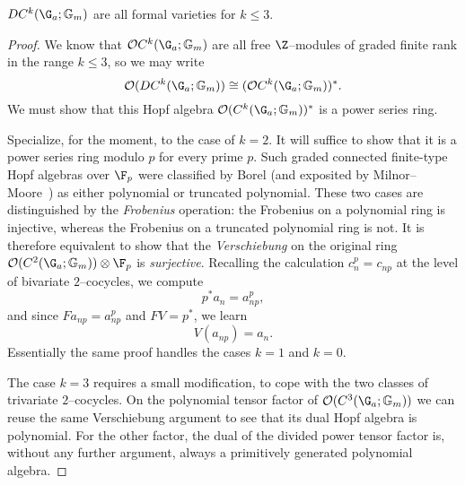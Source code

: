 \begin{lemma}\label{CkGaGmAreFVars}
\(DC^k(\G_a; \Gm)\) are all formal varieties for \(k \le 3\).
\end{lemma}
\begin{proof}
We know that \(\sheaf O C^k(\G_a; \Gm)\) are all free \(\Z\)--modules of graded finite rank in the range \(k \le 3\), so we may write \[\sheaf O(D C^k(\G_a; \Gm)) \cong (\sheaf O C^k(\G_a; \Gm))^*.\]  We must show that this Hopf algebra \(\sheaf O(C^k(\G_a; \Gm))^*\) is a power series ring.

Specialize, for the moment, to the case of \(k = 2\).  It will suffice to show that it is a power series ring modulo \(p\) for every prime \(p\).  Such graded connected finite-type Hopf algebras over \(\F_p\) were classified by Borel (and exposited by Milnor--Moore~\cite[Theorem 7.11]{MilnorMoore}) as either polynomial or truncated polynomial.  These two cases are distinguished by the \textit{Frobenius} operation: the Frobenius on a polynomial ring is injective, whereas the Frobenius on a truncated polynomial ring is not.  It is therefore equivalent to show that the \emph{Verschiebung} on the original ring \(\sheaf O(C^2(\G_a; \Gm)) \otimes \F_p\) is \emph{surjective}.  Recalling the calculation \(c_n^p = c_{np}\) at the level of bivariate \(2\)--cocycles, we compute \[p^* a_n = a_{np}^p,\] and since \(F a_{np} = a_{np}^p\) and \(FV = p^*\), we learn \[V(a_{np}) = a_n.\]  Essentially the same proof handles the cases \(k = 1\) and \(k = 0\).

The case \(k = 3\) requires a small modification, to cope with the two classes of trivariate \(2\)--cocycles.  On the polynomial tensor factor of \(\sheaf O(C^3(\G_a; \Gm))\) we can reuse the same Verschiebung argument to see that its dual Hopf algebra is polynomial.  For the other factor, the dual of the divided power tensor factor is, without any further argument, always a primitively generated polynomial algebra.
\end{proof}

